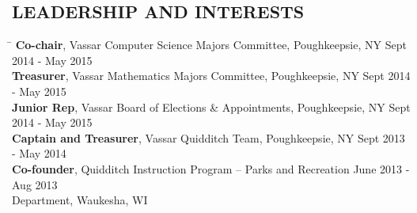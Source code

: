 \documentclass{res}
\begin{document}
\begin{resume}
{  \vspace{-18pt}
  \section{\hspace{0.2in}LEADERSHIP AND INTERESTS}
    \vspace{-3pt}
    \begin{tabbing}
      \hspace{5.65in}\=  \kill %
      {\bf Co-chair}, Vassar Computer Science Majors
          Committee, Poughkeepsie, NY\> Sept 2014 - May 2015\\
      {\bf Treasurer}, Vassar Mathematics Majors Committee, Poughkeepsie, NY\>
          Sept 2014 - May 2015\\
      {\bf Junior Rep}, Vassar Board of Elections \&
          Appointments, Poughkeepsie, NY\> Sept 2014 - May 2015\\
      {\bf Captain and Treasurer}, Vassar Quidditch Team, Poughkeepsie, NY\>
          Sept 2013 - May 2014\\
      {\bf Co-founder}, Quidditch Instruction Program -- Parks and Recreation\>
           June 2013 - Aug 2013\\
          \hspace{68pt} Department, Waukesha, WI\\
    \end{tabbing}
} %
\end{resume}
\end{document}
